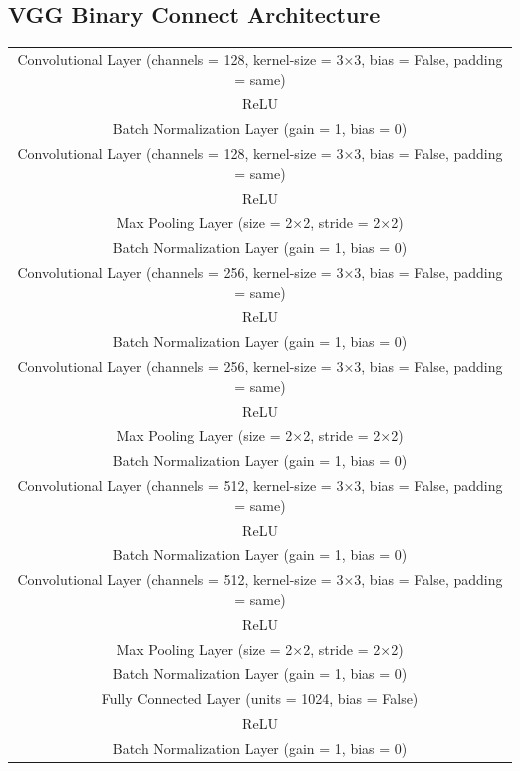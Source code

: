 \subsection*{VGG Binary Connect Architecture}
\begin{table}[H]
\begin{center}
\begin{tabular}{ c }
\hline
   Convolutional Layer (channels = 128, kernel-size = 3×3, bias = False, padding = same)\\ 
   ReLU \\
   Batch Normalization Layer (gain = 1, bias = 0)  \\
   Convolutional Layer (channels = 128, kernel-size = 3×3, bias = False, padding = same) \\ 
   ReLU \\
   Max Pooling Layer (size = 2×2, stride = 2×2)  \\
   Batch Normalization Layer (gain = 1, bias = 0) \\ \hline
   Convolutional Layer (channels = 256, kernel-size = 3×3, bias = False, padding = same)\\ 
   ReLU \\
   Batch Normalization Layer (gain = 1, bias = 0)  \\
   Convolutional Layer (channels = 256, kernel-size = 3×3, bias = False, padding = same) \\ 
   ReLU \\
   Max Pooling Layer (size = 2×2, stride = 2×2)  \\
   Batch Normalization Layer (gain = 1, bias = 0)  \\ \hline
   Convolutional Layer (channels = 512, kernel-size = 3×3, bias = False, padding = same) \\ 
   ReLU  \\
   Batch Normalization Layer (gain = 1, bias = 0) \\
   Convolutional Layer (channels = 512, kernel-size = 3×3, bias = False, padding = same) \\ 
   ReLU \\
   Max Pooling Layer (size = 2×2, stride = 2×2) \\
   Batch Normalization Layer (gain = 1, bias = 0)  \\ \hline
   Fully Connected Layer (units = 1024, bias = False) \\      
   ReLU \\      
   Batch Normalization Layer (gain = 1, bias = 0)  \\ \hline

\end{tabular}
\end{center}
\end{table}
